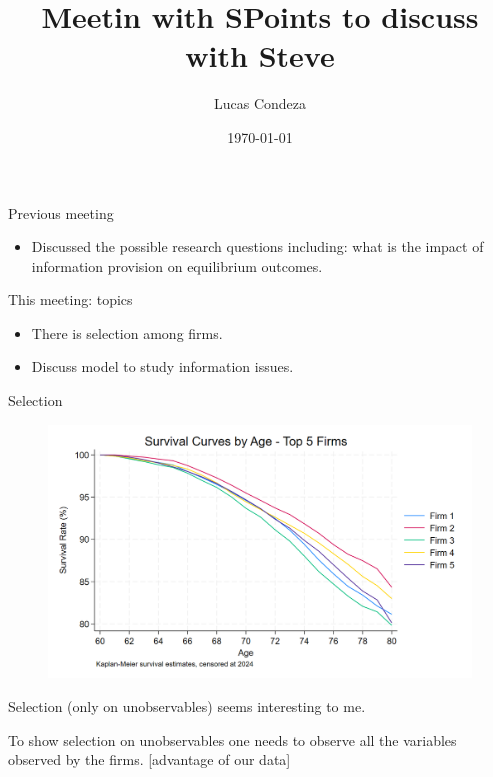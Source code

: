 \documentclass[10pt,aspectratio=169]{beamer}
\title{Meetin with SPoints to discuss with Steve}
\author{%
 Lucas Condeza
\inst{1} \and
}
\institute{
  \inst{1} Yale University \\
}
\date{\today}
\begin{document}






\begin{frame}{Previous meeting}

 \begin{itemize}
        \item Discussed the possible research questions including: what is the impact of information provision on equilibrium outcomes. 
        
\end{itemize}
\end{frame}


\begin{frame}{This meeting: topics}

 \begin{itemize}
        \item There is selection among firms. 
        \item Discuss model to study information issues. 
\end{itemize}
\end{frame}


\begin{frame}{Selection}

 \begin{figure}
     \centering
     \includegraphics[width=0.6\linewidth]{figures//IE4/IE4_survival_curves_by_age_top_firms.png}
     \label{fig:placeholder}
 \end{figure}
Selection (only on unobservables) seems interesting to me. 

To show selection on unobservables one needs to observe all the variables observed by the firms. [advantage of our data]


\end{frame}
\end{document}
